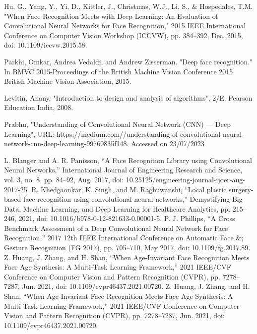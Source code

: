 \documentclass[12pt,a4paper]{report}
\begin{document}
\newpage
\pagestyle{plain}
\renewcommand{\bibname}{References}
\begin{thebibliography}{35}
Hu, G., Yang, Y., Yi, D., Kittler, J., Christmas, W.J., Li, S., \& Hospedales, T.M. "When Face Recognition Meets with Deep Learning: An Evaluation of Convolutional Neural Networks for Face Recognition," 2015 IEEE International Conference on Computer Vision Workshop (ICCVW), pp. 384–392, Dec. 2015, doi: 10.1109/iccvw.2015.58.

Parkhi, Omkar, Andrea Vedaldi, and Andrew Zisserman. "Deep face recognition." In BMVC 2015-Proceedings of the British Machine Vision Conference 2015. British Machine Vision Association, 2015.

Levitin, Anany. "Introduction to design and analysis of algorithms", 2/E. Pearson Education India, 2008.

Prabhu, "Understanding of Convolutional Neural Network (CNN) — Deep Learning", URL: https://medium.com/\@RaghavPrabhu/understanding-of-convolutional-neural-network-cnn-deep-learning-99760835f148. Accessed on 23/07/2023

L. Blanger and A. R. Panisson, “A Face Recognition Library using Convolutional Neural Networks,” International Journal of Engineering Research and Science, vol. 3, no. 8, pp. 84–92, Aug. 2017, doi: 10.25125/engineering-journal-ijoer-aug-2017-25.
R. Khedgaonkar, K. Singh, and M. Raghuwanshi, “Local plastic surgery-based face recognition using convolutional neural networks,” Demystifying Big Data, Machine Learning, and Deep Learning for Healthcare Analytics, pp. 215–246, 2021, doi: 10.1016/b978-0-12-821633-0.00001-5.
P. J. Phillips, “A Cross Benchmark Assessment of a Deep Convolutional Neural Network for Face Recognition,” 2017 12th IEEE International Conference on Automatic Face \&; Gesture Recognition (FG 2017), pp. 705–710, May 2017, doi: 10.1109/fg.2017.89.
Z. Huang, J. Zhang, and H. Shan, “When Age-Invariant Face Recognition Meets Face Age Synthesis: A Multi-Task Learning Framework,” 2021 IEEE/CVF Conference on Computer Vision and Pattern Recognition (CVPR), pp. 7278–7287, Jun. 2021, doi: 10.1109/cvpr46437.2021.00720.
Z. Huang, J. Zhang, and H. Shan, “When Age-Invariant Face Recognition Meets Face Age Synthesis: A Multi-Task Learning Framework,” 2021 IEEE/CVF Conference on Computer Vision and Pattern Recognition (CVPR), pp. 7278–7287, Jun. 2021, doi: 10.1109/cvpr46437.2021.00720.
\end{thebibliography}



% 

\end{document}
